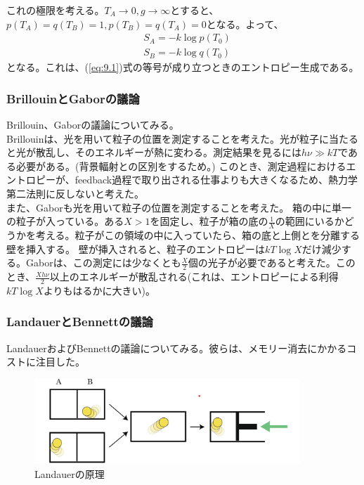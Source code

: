 \documentclass[a4paper,11pt]{jsarticle}
\numberwithin{equation}{section}
\begin{document}
これの極限を考える。$T_A \to 0,g \to \infty$とすると、$p(T_A) = q(T_B) = 1, p(T_B) = q(T_A) = 0$となる。よって、
\begin{align}
    & S_A = -k\log p(T_0) \\
    & S_B = -k\log q(T_0)
\end{align}
となる。これは、(\ref{eq:9.1})式の等号が成り立つときのエントロピー生成である。\\

\subsubsection{BrillouinとGaborの議論}
Brillouin、Gaborの議論についてみる。\\
Brillouinは、光を用いて粒子の位置を測定することを考えた。光が粒子に当たると光が散乱し、そのエネルギーが熱に変わる。測定結果を見るには$h\nu \gg kT$である必要がある。(背景輻射との区別をするため。)
このとき、測定過程におけるエントロピーが、feedback過程で取り出される仕事よりも大きくなるため、熱力学第二法則に反しないと考えた。\\

また、Gaborも光を用いて粒子の位置を測定することを考えた。
箱の中に単一の粒子が入っている。ある$X>1$を固定し、粒子が箱の底の$\frac{1}{X}$の範囲にいるかどうかを考える。粒子がこの領域の中に入っていたら、箱の底と上側とを分離する壁を挿入する。
壁が挿入されると、粒子のエントロピーは$kT\log X$だけ減少する。Gaborは、この測定には少なくとも$\frac{X}{2}$個の光子が必要であると考えた。このとき、$\frac{Xh\nu}{2} $以上のエネルギーが散乱される(これは、エントロピーによる利得$kT\log X$よりもはるかに大きい)。\\

\subsubsection{LandauerとBennettの議論}
LandauerおよびBennettの議論についてみる。彼らは、メモリー消去にかかるコストに注目した。\\

\begin{figure}
    \begin{center}
    \includegraphics[width=100mm]{Landauer.png}
    \end{center}
    \caption{Landauerの原理}
    \label{fig:Landauer}
\end{figure}
\end{document}
